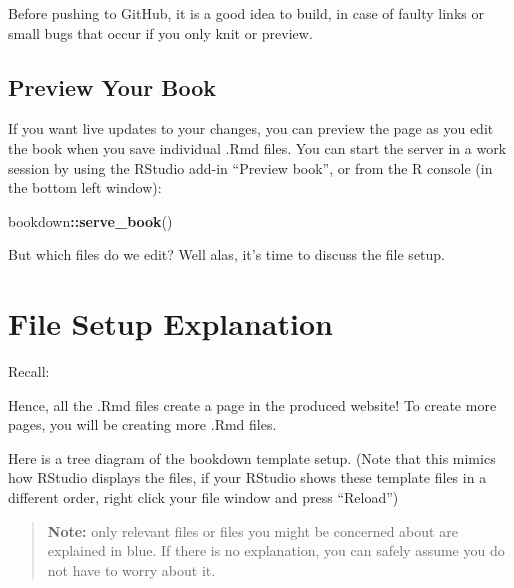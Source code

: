 \documentclass[
]{book}
\newenvironment{Shaded}{\begin{snugshade}}{\end{snugshade}}
\newcommand{\FunctionTok}[1]{\textcolor[rgb]{0.13,0.29,0.53}{\textbf{#1}}}
\newcommand{\NormalTok}[1]{#1}
\newcommand{\SpecialCharTok}[1]{\textcolor[rgb]{0.81,0.36,0.00}{\textbf{#1}}}
\theoremstyle{definition}
\theoremstyle{definition}
\theoremstyle{definition}
\theoremstyle{definition}
\theoremstyle{remark}
\begin{document}
Before pushing to GitHub, it is a good idea to build, in case of faulty links or small bugs that occur if you only knit or preview.

\subsection{Preview Your Book}\label{preview-your-book}

If you want live updates to your changes, you can preview the page as you edit the book when you save individual .Rmd files. You can start the server in a work session by using the RStudio add-in ``Preview book'', or from the R console (in the bottom left window):

\begin{Shaded}
\begin{Highlighting}[]
\NormalTok{bookdown}\SpecialCharTok{::}\FunctionTok{serve\_book}\NormalTok{()}
\end{Highlighting}
\end{Shaded}

But which files do we edit? Well alas, it's time to discuss the file setup.

\section{File Setup Explanation}\label{file-setup}

Recall:

Hence, all the .Rmd files create a page in the produced website! To create more pages, you will be creating more .Rmd files.

Here is a tree diagram of the bookdown template setup. (Note that this mimics how RStudio displays the files, if your RStudio shows these template files in a different order, right click your file window and press ``Reload'')

\begin{quote}
\textbf{Note:} only relevant files or files you might be concerned about are explained in blue. If there is no explanation, you can safely assume you do not have to worry about it.
\end{quote}
\end{document}
